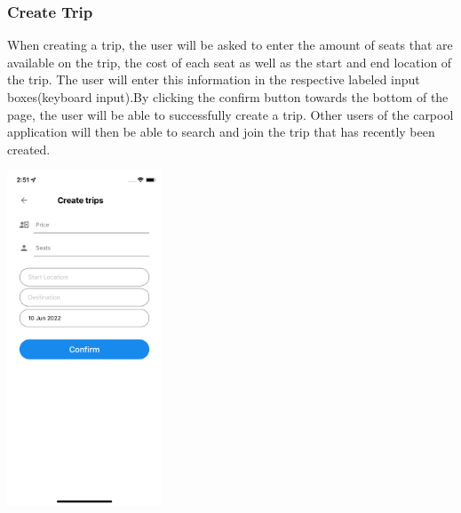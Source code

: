 \documentclass[hidelinks, 12pt, a4paper]{article}
\begin{document}
\subsubsection{Create Trip}
When creating a trip, the user will be asked to enter the amount of seats that are available on the trip, the cost of each seat as well as the start and end location of the trip. The user will enter this information in the respective labeled input boxes(keyboard input).By clicking the confirm button towards the bottom of the page, the user will be able to successfully create a trip. Other users of the carpool application will then be able to search and join the trip that has recently been created.
\begin{center}
  \includegraphics[height=10cm]{images/create_trip.png}
\end{center}
\vspace{1cm}
\end{document}
